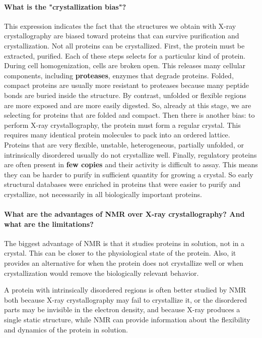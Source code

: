\paragraph{What is the "crystallization bias"?}
This expression indicates the fact that the structures we obtain with X-ray crystallography are biased toward proteins that can survive purification and crystallization.
Not all proteins can be crystallized. First, the protein must be extracted, purified. Each of these steps selects for a particular kind of protein.
During cell homogenization, cells are broken open. This releases many cellular components, including \textbf{proteases}, enzymes that degrade proteins. Folded, compact proteins are usually more resistant to proteases because many peptide bonds are buried inside the structure. 
By contrast, unfolded or flexible regions are more exposed and are more easily digested. So, already at this stage, we are selecting for proteins that are folded and compact.
Then there is another bias: to perform X-ray crystallography, the protein must form a regular crystal. This requires many identical protein molecules to pack into an ordered lattice. Proteins that are very flexible, unstable, heterogeneous, partially unfolded, or intrinsically disordered usually do not crystallize well.
Finally, regulatory proteins are often present in \textbf{few copies} and their activity is difficult to assay. This means they can be harder to purify in sufficient quantity for growing a crystal. So early structural databases were enriched in proteins that were easier to purify and crystallize, not necessarily in all biologically important proteins.


\paragraph{What are the advantages of NMR over X-ray crystallography? And what are the limitations?}

The biggest advantage of NMR is that it studies proteins in solution, not in a crystal. This can be closer to the physiological state of the protein.
Also, it provides an alternative for when the protein does not crystallize well or when crystallization would remove the biologically relevant behavior. 

A protein with intrinsically disordered regions is often better studied by NMR both because X-ray crystallography may fail to crystallize it, or the disordered parts may be invisible in the electron density, and because X-ray produces a single static structure, while NMR can provide information about the flexibility and dynamics of the protein in solution.

